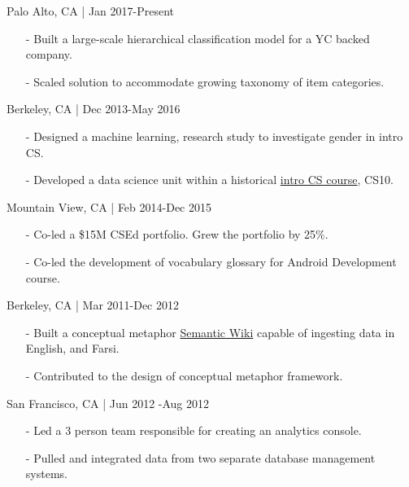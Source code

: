 \documentclass[11pt,article,oneside]{memoir}
\begin{document}
\bigskip

\medskip

 \hfill Palo Alto, CA | Jan 2017-Present
\begin{itemize}[nolistsep]
\item[-] Built a large-scale hierarchical classification model for a YC backed company.
\item[-] Scaled solution to accommodate growing taxonomy of item categories.
\end{itemize} 

 \hfill Berkeley, CA | Dec 2013-May 2016
\begin{itemize}[noitemsep,nolistsep]
\item[-] Designed a machine learning, research study to investigate gender in intro CS.
\item[-] Developed a data science unit within a historical \href{http://www.whitehouse.gov/the-press-office/2014/12/08/fact-sheet-new-commitments-support-computer-science-education}{intro CS course}, CS10.
\end{itemize}

 \hfill Mountain View, CA | Feb 2014-Dec 2015
\begin{itemize}[nolistsep]
\item[-]Co-led a \$15M CSEd portfolio. Grew the portfolio by 25\%.
\item[-]Co-led the development of vocabulary glossary for Android Development course.
\end{itemize} 

 \hfill Berkeley, CA | Mar 2011-Dec 2012
\begin{itemize}[nolistsep]
\item[-] Built a conceptual metaphor \href{http://metaphor.icsi.berkeley.edu}{Semantic Wiki} capable of ingesting data in English, and Farsi.
\item[-] Contributed to the design of conceptual metaphor framework.
\end{itemize} 

 \hfill San Francisco, CA | Jun 2012 -Aug 2012
\begin{itemize}[nolistsep]
\item[-]Led a 3 person team responsible for creating an analytics console.
\item[-]Pulled and integrated data from two separate database management systems.
\end{itemize} 
\end{document}
